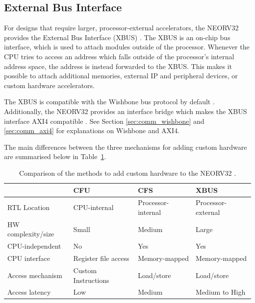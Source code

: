 \subsection{External Bus Interface}
\label{sec:neorv32_xbus}

For designs that require larger, processor-external accelerators, the NEORV32 provides the External Bus Interface (XBUS) \cite{Nolting2024Datasheet,Nolting2024UserGuide}. The XBUS is an on-chip bus interface, which is used to attach modules outside of the processor. Whenever the CPU tries to access an address which falls outside of the processor's internal address space, the address is instead forwarded to the XBUS. This makes it possible to attach additional memories, external IP and peripheral devices, or custom hardware accelerators.

The XBUS is compatible with the Wishbone bus protocol by default \cite{Nolting2024Datasheet}. Additionally, the NEORV32 provides an interface bridge which makes the XBUS interface AXI4 compatible \cite{Nolting2024UserGuide}. See Section \ref{sec:comm_wishbone} and \ref{sec:comm_axi4} for explanations on Wishbone and AXI4.

The main differences between the three mechanisms for adding custom hardware are summarised below in Table~\ref{tab:neorv_modules}.

\begin{table}[H]
\centering
\caption{Comparison of the methods to add custom hardware to the NEORV32 \cite{Nolting2024UserGuide}.}
\label{tab:neorv_modules}
\begin{tabular}{l|lll}
                           & CFU & CFS & XBUS \\ \hline
RTL Location               & CPU-internal                & Processor-internal               & Processor-external     \\
HW complexity/size         & Small                       & Medium                           & Large                  \\
CPU-independent  & No                          & Yes                              & Yes                    \\
CPU interface              & Register file access        & Memory-mapped                    & Memory-mapped          \\
Access mechanism & Custom Instructions         & Load/store                       & Load/store             \\
Access latency             & Low                         & Medium                           & Medium to High         \\          
\end{tabular}
\end{table}

